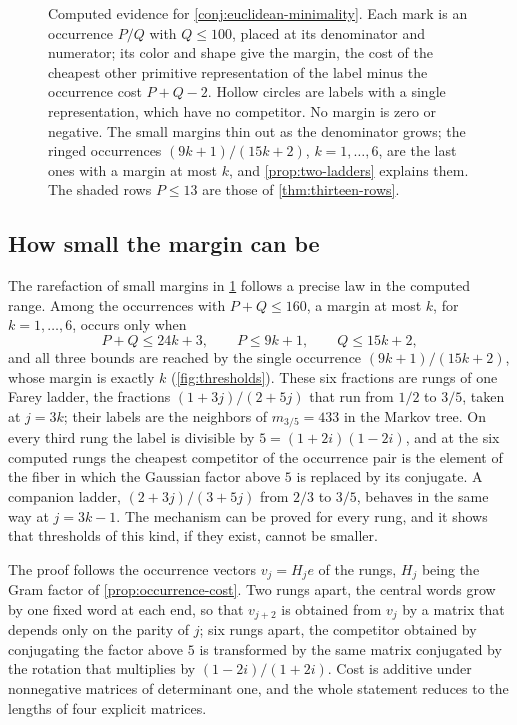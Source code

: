 \begin{figure}[tb]
\centering

\caption{Computed evidence for \cref{conj:euclidean-minimality}. Each mark is
an occurrence $P/Q$ with $Q\leqslant100$, placed at its denominator and
numerator; its color and shape give the margin, the cost of the cheapest
other primitive representation of the label minus the occurrence cost
$P+Q-2$. Hollow circles are labels with a single representation, which have
no competitor. No margin is zero or negative. The small margins thin out
as the denominator grows; the ringed occurrences $(9k+1)/(15k+2)$,
$k=1,\dots,6$, are the last ones with a margin at most $k$, and
\cref{prop:two-ladders} explains them. The shaded rows $P\leqslant13$ are those
of \cref{thm:thirteen-rows}.}
\label{fig:margins}
\end{figure}

\subsection{How small the margin can be}

The rarefaction of small margins in \cref{fig:margins} follows a precise
law in the computed range. Among the occurrences with $P+Q\leqslant160$, a
margin at most $k$, for $k=1,\dots,6$, occurs only when
$$
 P+Q\leqslant24k+3,\qquad P\leqslant9k+1,\qquad Q\leqslant15k+2 ,
$$
and all three bounds are reached by the single occurrence
$(9k+1)/(15k+2)$, whose margin is exactly $k$ (\cref{fig:thresholds}). These
six fractions are rungs of one Farey ladder, the fractions
$(1+3j)/(2+5j)$ that run from $1/2$ to $3/5$, taken at $j=3k$; their labels
are the neighbors of $m_{3/5}=433$ in the Markov tree. On every third rung
the label is divisible by $5=(1+2i)(1-2i)$, and at the six computed rungs
the cheapest competitor of the occurrence pair is the element of the fiber
in which the Gaussian factor above $5$ is replaced by its conjugate. A companion ladder,
$(2+3j)/(3+5j)$ from $2/3$ to $3/5$, behaves in the same way at $j=3k-1$. The
mechanism can be proved for every rung, and it shows that thresholds of
this kind, if they exist, cannot be smaller.

The proof follows the occurrence vectors $v_j=H_je$ of the rungs, $H_j$ being
the Gram factor of \cref{prop:occurrence-cost}. Two rungs apart, the central
words grow by one fixed word at each end, so that $v_{j+2}$ is obtained from
$v_j$ by a matrix that depends only on the parity of $j$; six rungs apart,
the competitor obtained by conjugating the factor above $5$ is transformed
by the same matrix conjugated by the rotation that multiplies by
$(1-2i)/(1+2i)$.
Cost is additive under nonnegative matrices of determinant one, and the
whole statement reduces to the lengths of four explicit matrices.

